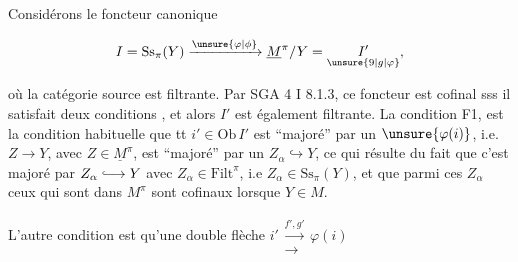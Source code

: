 



Considérons le foncteur canonique

\[
 I=\mathrm{Ss}_{\pi}(Y)\xrightarrow{\unsure{\varphi|\phi}}\underline M^\pi/Y=\underset{\unsure{9|g|\varphi}}{I'},
\]

où la catégorie source  est filtrante. Par SGA 4 I 8.1.3, ce foncteur est cofinal sss il satisfait deux conditions , et alors  $I'$ est également filtrante. La  condition F1,  est la condition habituelle que tt $i'\in\mathrm{Ob}\,I'$ est ``majoré'' par un $\unsure{\varphi(i)}$, i.e. \unsure{$\forall$} $Z\longrightarrow Y$, avec $Z\in\underline M^\pi$, est ``majoré'' par un  $Z_\alpha\hookrightarrow Y$,  ce qui résulte du fait que  c'est majoré par $Z_\alpha\lhook\joinrel\longrightarrow Y$ avec $Z_\alpha\in\mathrm{Filt}^{\pi}$,  i.e $Z_\alpha\in\mathrm{Ss}_\pi(Y)$, et que parmi ces $Z_\alpha$ ceux qui sont dans $M^\pi$ sont cofinaux lorsque $Y\in M$.


L'autre condition \unsure{*} est qu'une double flèche $i'\mathrel{\substack{\xrightarrow{f',g'}\\[-.5ex]\longrightarrow}}\varphi(i)$ 

